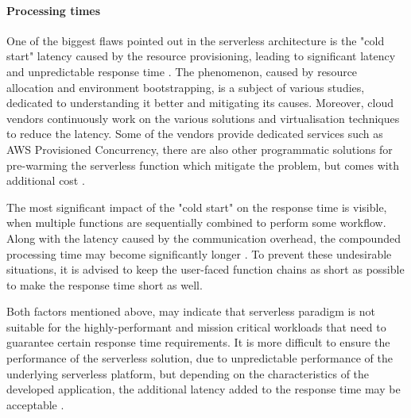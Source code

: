 
\paragraph{Processing times} \label{chapter:serverless-suitability-processing-time}
 
One of the biggest flaws pointed out in the serverless architecture is the "cold start" latency caused by the resource provisioning, leading to significant latency and unpredictable response time \cite{BerkeleyServerless}.
The phenomenon, caused by resource allocation and environment bootstrapping, is a subject of various studies, dedicated to understanding it better and mitigating its causes. Moreover, cloud vendors continuously work on the various solutions and virtualisation techniques to reduce the latency. Some of the vendors provide dedicated services such as AWS Provisioned Concurrency, there are also other programmatic solutions for pre-warming the serverless function which mitigate the problem, but comes with additional cost \cite{MartinFowlerServerless}.

The most significant impact of the "cold start" on the response time is visible, when multiple functions are sequentially combined to perform some workflow. Along with the latency caused by the communication overhead, the compounded processing time may become significantly longer \cite{EvaluationOfServerlessApplicationProgrammingModel}.
To prevent these undesirable situations, it is advised to keep the user-faced function chains as short as possible to make the response time short as well.

Both factors mentioned above, may indicate that serverless paradigm is not suitable for the highly-performant and mission critical workloads that need to guarantee certain response time requirements.
It is more difficult to ensure the performance of the serverless solution, due to unpredictable performance of the underlying serverless platform, but depending on the characteristics of the developed application, the additional latency added to the response time may be acceptable \cite{LeveragingServerlessCloudComputingArchitectures}.

